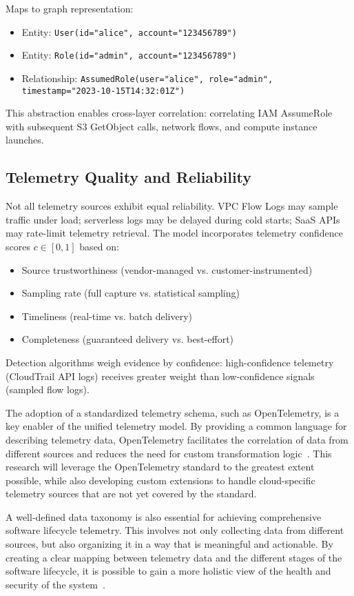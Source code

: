 Maps to graph representation:
\begin{itemize}
    \item Entity: \texttt{User(id="alice", account="123456789")}
    \item Entity: \texttt{Role(id="admin", account="123456789")}
    \item Relationship: \texttt{AssumedRole(user="alice", role="admin", timestamp="2023-10-15T14:32:01Z")}
\end{itemize}

This abstraction enables cross-layer correlation: correlating IAM AssumeRole with subsequent S3 GetObject calls, network flows, and compute instance launches.

\subsection{Telemetry Quality and Reliability}
Not all telemetry sources exhibit equal reliability. VPC Flow Logs may sample traffic under load; serverless logs may be delayed during cold starts; SaaS APIs may rate-limit telemetry retrieval. The model incorporates telemetry confidence scores $c \in [0,1]$ based on:
\begin{itemize}
    \item Source trustworthiness (vendor-managed vs. customer-instrumented)
    \item Sampling rate (full capture vs. statistical sampling)
    \item Timeliness (real-time vs. batch delivery)
    \item Completeness (guaranteed delivery vs. best-effort)
\end{itemize}

Detection algorithms weigh evidence by confidence: high-confidence telemetry (CloudTrail API logs) receives greater weight than low-confidence signals (sampled flow logs).

The adoption of a standardized telemetry schema, such as OpenTelemetry, is a key enabler of the unified telemetry model. By providing a common language for describing telemetry data, OpenTelemetry facilitates the correlation of data from different sources and reduces the need for custom transformation logic~\cite{opentelemetry2024schema}. This research will leverage the OpenTelemetry standard to the greatest extent possible, while also developing custom extensions to handle cloud-specific telemetry sources that are not yet covered by the standard.

A well-defined data taxonomy is also essential for achieving comprehensive software lifecycle telemetry. This involves not only collecting data from different sources, but also organizing it in a way that is meaningful and actionable. By creating a clear mapping between telemetry data and the different stages of the software lifecycle, it is possible to gain a more holistic view of the health and security of the system~\cite{gathr2024taxonomy}.

